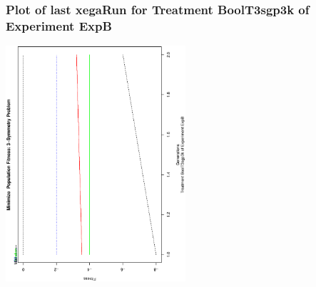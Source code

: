  \begin{frame}
 \frametitle{ Plot of last xegaRun for Treatment BoolT3sgp3k of Experiment ExpB }
 \begin{center}
\includegraphics[width=0.5\textwidth, angle=-90]
{ExpBPlotPopStatsFigure016.eps}
 \end{center}
 \label{report/ExpBPlotPopStatsFigure016.eps}  
 \end{frame}

